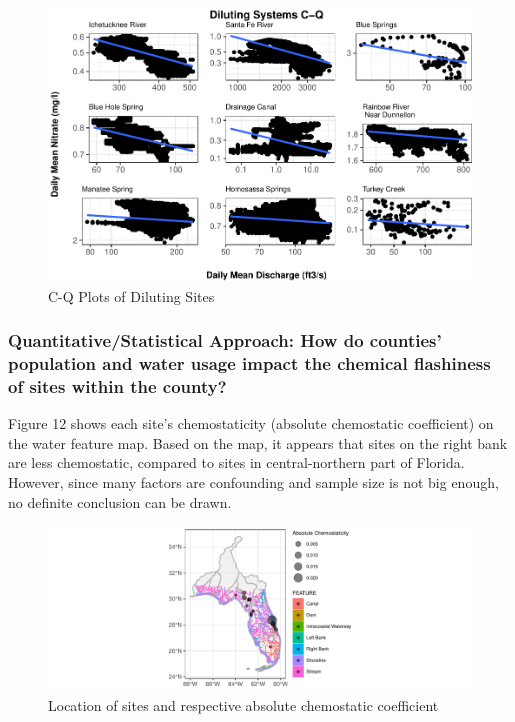 \documentclass[12pt,]{article}
\begin{document}
\begin{figure}
\centering
\includegraphics{Final-Project-Report_files/figure-latex/unnamed-chunk-16-1.pdf}
\caption{C-Q Plots of Diluting Sites}
\end{figure}

\hypertarget{quantitativestatistical-approach-how-do-counties-population-and-water-usage-impact-the-chemical-flashiness-of-sites-within-the-county}{%
\subsubsection{Quantitative/Statistical Approach: How do counties'
population and water usage impact the chemical flashiness of sites
within the
county?}\label{quantitativestatistical-approach-how-do-counties-population-and-water-usage-impact-the-chemical-flashiness-of-sites-within-the-county}}

Figure 12 shows each site's chemostaticity (absolute chemostatic
coefficient) on the water feature map. Based on the map, it appears that
sites on the right bank are less chemostatic, compared to sites in
central-northern part of Florida. However, since many factors are
confounding and sample size is not big enough, no definite conclusion
can be drawn.

\begin{figure}
\centering
\includegraphics{Final-Project-Report_files/figure-latex/unnamed-chunk-17-1.pdf}
\caption{Location of sites and respective absolute chemostatic
coefficient}
\end{figure}
\end{document}
